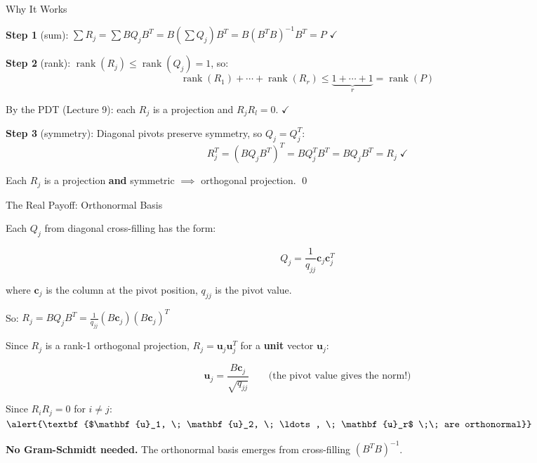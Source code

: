 \documentclass[10pt]{beamer}
\theoremstyle{definition}
\newcommand{\x}[1]{\alert{\textbf{#1}}}
\begin{document}
\begin{frame}{Why It Works}

\x{Step 1} (sum): $\sum R_j = \sum BQ_jB^T = B\left(\sum Q_j\right)B^T = B(B^TB)^{-1}B^T = P$ $\checkmark$

\vspace{0.5em}

\x{Step 2} (rank): $\operatorname{rank}(R_j) \leq \operatorname{rank}(Q_j) = 1$, so:
$$\operatorname{rank}(R_1) + \cdots + \operatorname{rank}(R_r) \leq \underbrace{1 + \cdots + 1}_{r} = \operatorname{rank}(P)$$

By the PDT (Lecture 9): each $R_j$ is a projection and $R_j R_l = 0$. $\checkmark$

\vspace{0.5em}

\x{Step 3} (symmetry): Diagonal pivots preserve symmetry, so $Q_j = Q_j^T$:
$$R_j^T = (BQ_jB^T)^T = BQ_j^TB^T = BQ_jB^T = R_j \;\checkmark$$

Each $R_j$ is a projection \x{and} symmetric $\implies$ orthogonal projection. \qed

\end{frame}


\begin{frame}{The Real Payoff: Orthonormal Basis}

Each $Q_j$ from diagonal cross-filling has the form:

$$Q_j = \frac{1}{q_{jj}} \mathbf{c}_j \mathbf{c}_j^T$$

where $\mathbf{c}_j$ is the column at the pivot position, $q_{jj}$ is the pivot value.

\vspace{0.3em}

So: $R_j = BQ_jB^T = \frac{1}{q_{jj}} (B\mathbf{c}_j)(B\mathbf{c}_j)^T$

\vspace{0.3em}

Since $R_j$ is a rank-1 orthogonal projection, $R_j = \mathbf{u}_j\mathbf{u}_j^T$ for a \x{unit} vector $\mathbf{u}_j$:

$$\mathbf{u}_j = \frac{B\mathbf{c}_j}{\sqrt{q_{jj}}} \qquad \text{(the pivot value gives the norm!)}$$

\vspace{0.3em}

Since $R_iR_j = 0$ for $i \neq j$: \;\; $\x{$\mathbf{u}_1, \; \mathbf{u}_2, \; \ldots, \; \mathbf{u}_r$ \;\; are orthonormal}$

\vspace{0.3em}

\x{No Gram-Schmidt needed.} The orthonormal basis emerges from cross-filling $(B^TB)^{-1}$.

\end{frame}
\end{document}

